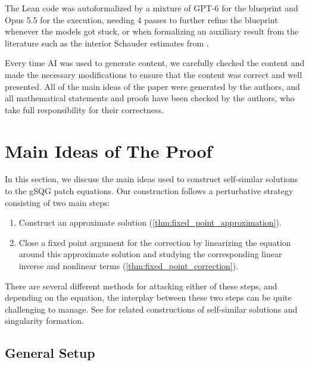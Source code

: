 \documentclass[11pt]{amsart}
\theoremstyle{definition}
\theoremstyle{remark}
\numberwithin{equation}{section}
\begin{document}
The Lean code was autoformalized by a mixture of GPT-6 for the blueprint and Opus 5.5 for the execution, needing 4 passes to further refine the blueprint whenever the models got stuck, or when formalizing an auxiliary result from the literature such as the interior Schauder estimates from \cite{RosOton-Serra:dirichlet-fractional-laplacian}.
\par Every time AI was used to generate content, we carefully checked the content and made the necessary modifications to ensure that the content was correct and well presented. All of the main ideas of the paper were generated by the authors, and all mathematical statements and proofs have been checked by the authors, who take full responsibility for their correctness.



\section{Main Ideas of The Proof}\label{sec:main_ideas}

In this section, we discuss the main ideas used to construct self-similar solutions to the gSQG patch equations. Our construction follows a perturbative strategy consisting of two main steps:
\begin{enumerate}
    \item Construct an approximate solution (\cref{thm:fixed_point_approximation}).
    \item Close a fixed point argument for the correction by linearizing the equation around this approximate solution and studying the corresponding linear inverse and nonlinear terms (\cref{thm:fixed_point_correction}).
\end{enumerate}
There are several different methods for attacking either of these steps, and depending on the equation, the interplay between these two steps can be quite challenging to manage. See \cite{GarciaJuarez-GomezSerrano-Nguyen-Pausader:self-similar-muskat,Garcia-GomezSerrano:self-similar-spirals-gsqg,Merle-Raphael-Rodnianski-Szeftel:implosion-i,Merle-Raphael-Rodnianski-Szeftel:implosion-ii,Buckmaster-CaoLabora-GomezSerrano:imploding-compressible-fluids,Buckmaster-Shkoller-Vicol:point-shocks-3d-euler} for related constructions of self-similar solutions and singularity formation.

\subsection{General Setup}
\end{document}

